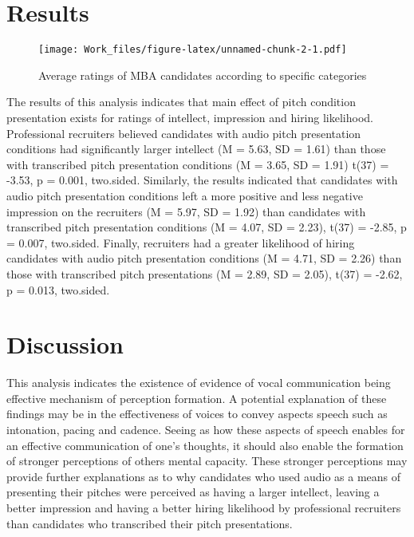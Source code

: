 \documentclass[
  english,
  man,floatsintext]{apa6}
\begin{document}
\hypertarget{results}{%
\section{Results}\label{results}}

\begin{figure}
\centering
\texttt{[image: Work\_files/figure-latex/unnamed-chunk-2-1.pdf]}
\caption{\label{fig:unnamed-chunk-2}Average ratings of MBA candidates according to specific categories}
\end{figure}

The results of this analysis indicates that main effect of pitch condition presentation exists for ratings of intellect, impression and hiring likelihood. Professional recruiters believed candidates with audio pitch presentation conditions had significantly larger intellect (M = 5.63, SD = 1.61) than those with transcribed pitch presentation conditions (M = 3.65, SD = 1.91) t(37) = -3.53, p = 0.001, two.sided. Similarly, the results indicated that candidates with audio pitch presentation conditions left a more positive and less negative impression on the recruiters (M = 5.97, SD = 1.92) than candidates with transcribed pitch presentation conditions (M = 4.07, SD = 2.23), t(37) = -2.85, p = 0.007, two.sided. Finally, recruiters had a greater likelihood of hiring candidates with audio pitch presentation conditions (M = 4.71, SD = 2.26) than those with transcribed pitch presentations (M = 2.89, SD = 2.05), t(37) = -2.62, p = 0.013, two.sided.

\hypertarget{discussion}{%
\section{Discussion}\label{discussion}}

This analysis indicates the existence of evidence of vocal communication being effective mechanism of perception formation. A potential explanation of these findings may be in the effectiveness of voices to convey aspects speech such as intonation, pacing and cadence. Seeing as how these aspects of speech enables for an effective communication of one's thoughts, it should also enable the formation of stronger perceptions of others mental capacity. These stronger perceptions may provide further explanations as to why candidates who used audio as a means of presenting their pitches were perceived as having a larger intellect, leaving a better impression and having a better hiring likelihood by professional recruiters than candidates who transcribed their pitch presentations.
\end{document}
